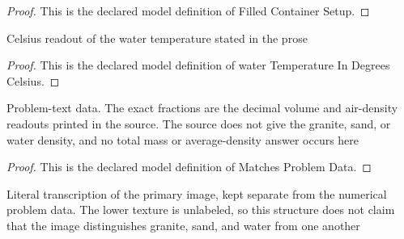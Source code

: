 \begin{proof}
  This is the declared model definition of Filled Container Setup.
\end{proof}
\begin{definition}
  \label{def:physics:phyx-mini-0380:phyxminiproblems-problemphyxmini0380-watertemperatureindegreescelsius}
  Celsius readout of the water temperature stated in the prose
\end{definition}
\begin{proof}
  This is the declared model definition of water Temperature In Degrees Celsius.
\end{proof}
\begin{definition}
  \label{def:physics:phyx-mini-0380:phyxminiproblems-problemphyxmini0380-matchesproblemdata}
  Problem-text data. The exact fractions are the decimal volume and air-density readouts printed in the source. The source does not give the granite, sand, or water density, and no total mass or average-density answer occurs here
\end{definition}
\begin{proof}
  This is the declared model definition of Matches Problem Data.
\end{proof}
\begin{definition}
  \label{def:physics:phyx-mini-0380:phyxminiproblems-problemphyxmini0380-matchesprimaryfigure}
  Literal transcription of the primary image, kept separate from the numerical problem data. The lower texture is unlabeled, so this structure does not claim that the image distinguishes granite, sand, and water from one another
\end{definition}
